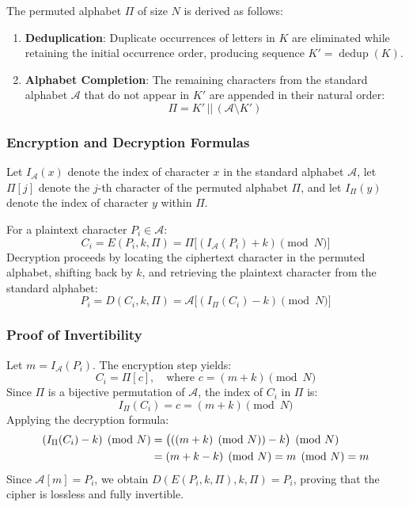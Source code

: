 \documentclass{labreport}
\begin{document}
The permuted alphabet $\Pi$ of size $N$ is derived as follows:
\begin{enumerate}
    \item \textbf{Deduplication}: Duplicate occurrences of letters in $K$ are eliminated while retaining the initial occurrence order, producing sequence $K' = \operatorname{dedup}(K)$.
    \item \textbf{Alphabet Completion}: The remaining characters from the standard alphabet $\mathcal{A}$ that do not appear in $K'$ are appended in their natural order:
    \begin{equation}
    \Pi = K' \,||\, (\mathcal{A} \setminus K')
    \end{equation}
\end{enumerate}

\subsubsection{Encryption and Decryption Formulas}
Let $I_{\mathcal{A}}(x)$ denote the index of character $x$ in the standard alphabet $\mathcal{A}$, let $\Pi[j]$ denote the $j$-th character of the permuted alphabet $\Pi$, and let $I_{\Pi}(y)$ denote the index of character $y$ within $\Pi$.

For a plaintext character $P_i \in \mathcal{A}$:
\begin{equation}
C_i = E(P_i, k, \Pi) = \Pi\big[(I_{\mathcal{A}}(P_i) + k) \pmod N\big]
\end{equation}
Decryption proceeds by locating the ciphertext character in the permuted alphabet, shifting back by $k$, and retrieving the plaintext character from the standard alphabet:
\begin{equation}
P_i = D(C_i, k, \Pi) = \mathcal{A}\big[(I_{\Pi}(C_i) - k) \pmod N\big]
\end{equation}

\subsubsection{Proof of Invertibility}
Let $m = I_{\mathcal{A}}(P_i)$. The encryption step yields:
\begin{equation}
C_i = \Pi[c], \quad \text{where } c = (m + k) \pmod N
\end{equation}
Since $\Pi$ is a bijective permutation of $\mathcal{A}$, the index of $C_i$ in $\Pi$ is:
\begin{equation}
I_{\Pi}(C_i) = c = (m + k) \pmod N
\end{equation}
Applying the decryption formula:
\begin{align}
(I_{\Pi}(C_i) - k) \pmod N &= \big(((m + k) \pmod N) - k\big) \pmod N \notag \\
&= (m + k - k) \pmod N = m \pmod N = m
\end{align}
Since $\mathcal{A}[m] = P_i$, we obtain $D(E(P_i, k, \Pi), k, \Pi) = P_i$, proving that the cipher is lossless and fully invertible.
\end{document}
